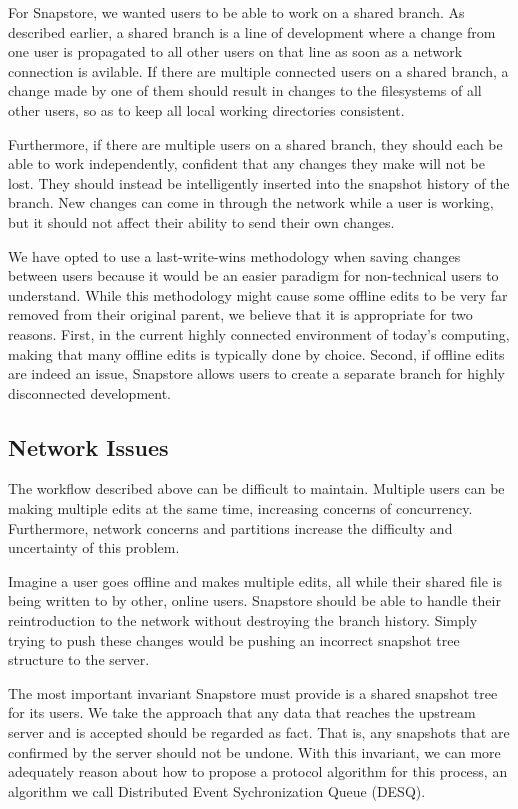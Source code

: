 For Snapstore, we wanted users to be able to work on a shared branch. As described earlier, a shared branch is a line of development where a change from one user is propagated to all other users on that line as soon as a network connection is avilable. If there are multiple connected users on a shared branch, a change made by one of them should result in changes to the filesystems of all other users, so as to keep all local working directories consistent.

Furthermore, if there are multiple users on a shared branch, they should each be able to work independently, confident that any changes they make will not be lost. They should instead be intelligently inserted into the snapshot history of the branch. New changes can come in through the network while a user is working, but it should not affect their ability to send their own changes.

We have opted to use a last-write-wins methodology when saving changes between users because it would be an easier paradigm for non-technical users to understand. While this methodology might cause some offline edits to be very far removed from their original parent, we believe that it is appropriate for two reasons. First, in the current highly connected environment of today's computing, making that many offline edits is typically done by choice. Second, if offline edits are indeed an issue, Snapstore allows users to create a separate branch for highly disconnected development. 

\subsection{Network Issues}

The workflow described above can be difficult to maintain. Multiple users can be making multiple edits at the same time, increasing concerns of concurrency.  Furthermore, network concerns and partitions increase the difficulty and uncertainty of this problem. 

Imagine a user goes offline and makes multiple edits, all while their shared file is being written to by other, online users. Snapstore should be able to handle their reintroduction to the network without destroying the branch history. Simply trying to push these changes would be pushing an incorrect snapshot tree structure to the server. 

The most important invariant Snapstore must provide is a shared snapshot tree for its users. We take the approach that any data that reaches the upstream server and is accepted should be regarded as fact. That is, any snapshots that are confirmed by the server should not be undone. With this invariant, we can more adequately reason about how to propose a protocol algorithm for this process, an algorithm we call Distributed Event Sychronization Queue (DESQ).

